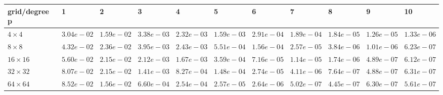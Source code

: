 \begin{tabular}{lllllllllll}
\hline
 grid/degree p   & 1          & 2          & 3          & 4          & 5          & 6          & 7          & 8          & 9          & 10         \\
\hline
 $4 \times 4$    & $3.04e-02$ & $1.59e-02$ & $3.38e-03$ & $2.32e-03$ & $1.59e-03$ & $2.91e-04$ & $1.89e-04$ & $1.84e-05$ & $1.26e-05$ & $1.33e-06$ \\
 $8 \times 8$    & $4.32e-02$ & $2.36e-02$ & $3.95e-03$ & $2.43e-03$ & $5.51e-04$ & $1.56e-04$ & $2.57e-05$ & $3.84e-06$ & $1.01e-06$ & $6.23e-07$ \\
 $16 \times 16$  & $5.60e-02$ & $2.15e-02$ & $2.12e-03$ & $1.67e-03$ & $3.59e-04$ & $7.16e-05$ & $1.14e-05$ & $1.74e-06$ & $4.89e-07$ & $6.12e-07$ \\
 $32 \times 32$  & $8.07e-02$ & $2.15e-02$ & $1.41e-03$ & $8.27e-04$ & $1.48e-04$ & $2.74e-05$ & $4.11e-06$ & $7.64e-07$ & $4.88e-07$ & $6.31e-07$ \\
 $64 \times 64$  & $8.52e-02$ & $1.56e-02$ & $6.60e-04$ & $2.54e-04$ & $2.57e-05$ & $2.64e-06$ & $5.02e-07$ & $4.45e-07$ & $6.30e-07$ & $5.61e-07$ \\
\hline
\end{tabular}